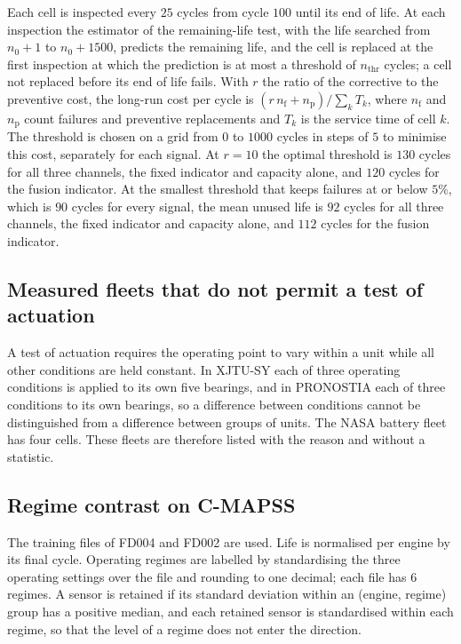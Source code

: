 \documentclass[12pt]{article}
\begin{document}
Each cell is inspected every $25$ cycles from cycle $100$ until its end of
life. At each inspection the estimator of the remaining-life test, with the
life searched from $n_0+1$ to $n_0+1500$, predicts the remaining life, and the
cell is replaced at the first inspection at which the prediction is at most a
threshold of $n_{\mathrm{thr}}$ cycles; a cell not replaced before its end of life fails. With
$r$ the ratio of the corrective to the preventive cost, the long-run cost per
cycle is $(r\,n_{\mathrm f}+n_{\mathrm p})/\sum_kT_k$, where $n_{\mathrm f}$
and $n_{\mathrm p}$ count failures and preventive replacements and $T_k$ is
the service time of cell $k$. The threshold is chosen on a grid from $0$ to
$1000$ cycles in steps of $5$ to minimise this cost, separately for each
signal. At $r=10$ the optimal threshold is $130$ cycles for all three
channels, the fixed indicator and capacity alone, and $120$ cycles for the
fusion indicator. At the smallest threshold that keeps failures at or below
$5\%$, which is $90$ cycles for every signal, the mean unused life is $92$
cycles for all three channels, the fixed indicator and capacity alone, and
$112$ cycles for the fusion indicator.

\subsection{Measured fleets that do not permit a test of actuation}

A test of actuation requires the operating point to vary within a unit while
all other conditions are held constant. In XJTU-SY each of three operating
conditions is applied to its own five bearings, and in PRONOSTIA each of three
conditions to its own bearings, so a difference between conditions cannot be
distinguished from a difference between groups of units. The NASA battery
fleet has four cells. These fleets are therefore listed with the reason and
without a statistic.

\subsection{Regime contrast on C-MAPSS}

The training files of FD004 and FD002 are used. Life is normalised per engine
by its final cycle. Operating regimes are labelled by standardising the three
operating settings over the file and rounding to one decimal; each file has
$6$ regimes. A sensor is retained if its standard deviation within an
(engine, regime) group has a positive median, and each retained sensor is
standardised within each regime, so that the level of a regime does not enter
the direction.
\end{document}
